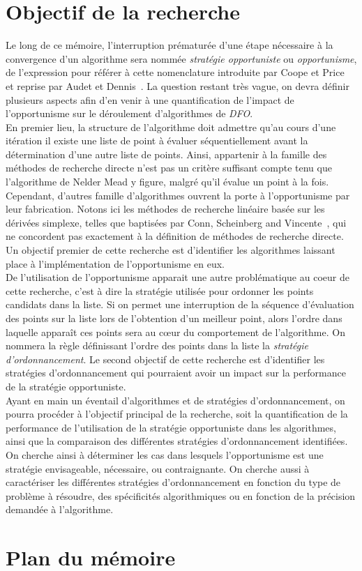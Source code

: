 \section{Objectif de la recherche}
Le long de ce mémoire, l'interruption prématurée d'une étape nécessaire à la convergence d'un algorithme sera nommée \textit{stratégie opportuniste} ou \textit{opportunisme}, de l'expression pour référer à cette nomenclature introduite par Coope et Price~\cite{CoPr01a} et reprise par Audet et Dennis~\cite{AuDe04a}. La question restant très vague, on devra définir plusieurs aspects afin d'en venir à une quantification de l'impact de l'opportunisme sur le déroulement d'algorithmes de \textit{DFO}.\\
En premier lieu, la structure de l'algorithme doit admettre qu'au cours d'une itération il existe une liste de point à évaluer séquentiellement avant la détermination d'une autre liste de points. Ainsi, appartenir à la famille des méthodes de recherche directe n'est pas un critère suffisant compte tenu que l'algorithme de Nelder Mead y figure, malgré qu'il évalue un point à la fois. Cependant, d'autres famille d'algorithmes ouvrent la porte à l'opportunisme par leur fabrication. Notons ici les méthodes de recherche linéaire basée sur les dérivées simplexe, telles que baptisées par Conn, Scheinberg and Vincente~\cite{CoScVibook}, qui ne concordent pas exactement à la définition de méthodes de recherche directe. Un objectif premier de cette recherche est d'identifier les algorithmes laissant place à l'implémentation de l'opportunisme en eux.\\
De l'utilisation de l'opportunisme apparait une autre problématique au coeur de cette recherche, c'est à dire la stratégie utilisée pour ordonner les points candidats dans la liste. Si on permet une interruption de la séquence d'évaluation des points sur la liste lors de l'obtention d'un meilleur point, alors l'ordre dans laquelle apparaît ces points sera au cœur du comportement de l'algorithme. On nommera la règle définissant l'ordre des points dans la liste la \textit{stratégie d'ordonnancement}. Le second objectif de cette recherche est d'identifier les stratégies d'ordonnancement qui pourraient avoir un impact sur la performance de la stratégie opportuniste.\\
Ayant en main un éventail d'algorithmes et de stratégies d'ordonnancement, on pourra procéder à l'objectif principal de la recherche, soit la quantification de la performance de l'utilisation de la stratégie opportuniste dans les algorithmes, ainsi que la comparaison des différentes stratégies d'ordonnancement identifiées. On cherche ainsi à déterminer les cas dans lesquels l'opportunisme est une stratégie envisageable, nécessaire, ou contraignante. On cherche aussi à caractériser les différentes stratégies d'ordonnancement en fonction du type de problème à résoudre, des spécificités algorithmiques ou en fonction de la précision demandée à l'algorithme. 
\section{Plan du mémoire}
